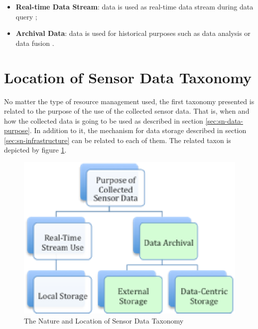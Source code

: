 \begin{itemize}
  \item \textbf{Real-time Data Stream}: data is used as real-time data stream
  during data query \cite{sn-intro01};
  \item \textbf{Archival Data}: data is used for historical purposes such as
  data analysis or data fusion \cite{sn-intro01, sn-intro02}.
\end{itemize}

\section{Location of Sensor Data Taxonomy}

No matter the type of resource management used, the first taxonomy presented is
related to the purpose of the use of the collected sensor data. That is, when
and how the collected data is going to be used as described in section
\ref{sec:sn-data-purpose}. In addition to it, the mechanism for data storage
described in section \ref{sec:sn-infrastructure} can be related to each of
them. The related taxon is depicted by figure \ref{fig:taxonomy-data-purpose}.

\begin{figure}[h]
  \centering
  \includegraphics{../diagrams/taxonomy-data-purpose}
  \caption{The Nature and Location of Sensor Data Taxonomy}
  \label{fig:taxonomy-data-purpose}
\end{figure}

